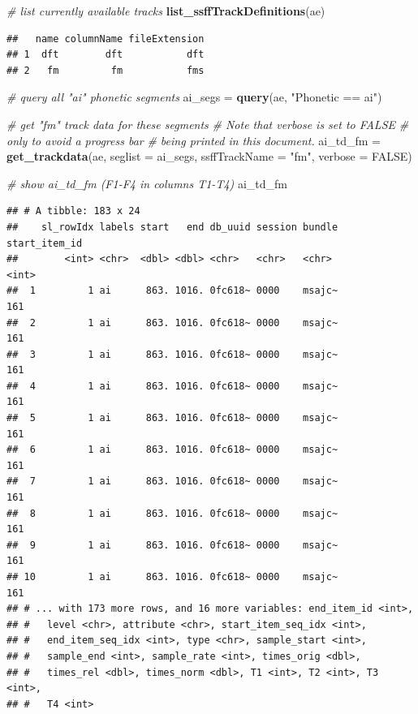\documentclass[]{book}
\newenvironment{Shaded}{\begin{snugshade}}{\end{snugshade}}
\newcommand{\CommentTok}[1]{\textcolor[rgb]{0.56,0.35,0.01}{\textit{#1}}}
\newcommand{\DataTypeTok}[1]{\textcolor[rgb]{0.13,0.29,0.53}{#1}}
\newcommand{\KeywordTok}[1]{\textcolor[rgb]{0.13,0.29,0.53}{\textbf{#1}}}
\newcommand{\NormalTok}[1]{#1}
\newcommand{\OtherTok}[1]{\textcolor[rgb]{0.56,0.35,0.01}{#1}}
\newcommand{\StringTok}[1]{\textcolor[rgb]{0.31,0.60,0.02}{#1}}
\begin{document}
\begin{Shaded}
\begin{Highlighting}[]
\CommentTok{# list currently available tracks}
\KeywordTok{list_ssffTrackDefinitions}\NormalTok{(ae)}
\end{Highlighting}
\end{Shaded}

\begin{verbatim}
##   name columnName fileExtension
## 1  dft        dft           dft
## 2   fm         fm           fms
\end{verbatim}

\begin{Shaded}
\begin{Highlighting}[]
\CommentTok{# query all "ai" phonetic segments}
\NormalTok{ai_segs =}\StringTok{ }\KeywordTok{query}\NormalTok{(ae, }\StringTok{"Phonetic == ai"}\NormalTok{)}

\CommentTok{# get "fm" track data for these segments}
\CommentTok{# Note that verbose is set to FALSE}
\CommentTok{# only to avoid a progress bar}
\CommentTok{# being printed in this document.}
\NormalTok{ai_td_fm =}\StringTok{ }\KeywordTok{get_trackdata}\NormalTok{(ae,}
                         \DataTypeTok{seglist =}\NormalTok{ ai_segs,}
                         \DataTypeTok{ssffTrackName =} \StringTok{"fm"}\NormalTok{,}
                         \DataTypeTok{verbose =} \OtherTok{FALSE}\NormalTok{)}

\CommentTok{# show ai_td_fm (F1-F4 in columns T1-T4)}
\NormalTok{ai_td_fm}
\end{Highlighting}
\end{Shaded}

\begin{verbatim}
## # A tibble: 183 x 24
##    sl_rowIdx labels start   end db_uuid session bundle start_item_id
##        <int> <chr>  <dbl> <dbl> <chr>   <chr>   <chr>          <int>
##  1         1 ai      863. 1016. 0fc618~ 0000    msajc~           161
##  2         1 ai      863. 1016. 0fc618~ 0000    msajc~           161
##  3         1 ai      863. 1016. 0fc618~ 0000    msajc~           161
##  4         1 ai      863. 1016. 0fc618~ 0000    msajc~           161
##  5         1 ai      863. 1016. 0fc618~ 0000    msajc~           161
##  6         1 ai      863. 1016. 0fc618~ 0000    msajc~           161
##  7         1 ai      863. 1016. 0fc618~ 0000    msajc~           161
##  8         1 ai      863. 1016. 0fc618~ 0000    msajc~           161
##  9         1 ai      863. 1016. 0fc618~ 0000    msajc~           161
## 10         1 ai      863. 1016. 0fc618~ 0000    msajc~           161
## # ... with 173 more rows, and 16 more variables: end_item_id <int>,
## #   level <chr>, attribute <chr>, start_item_seq_idx <int>,
## #   end_item_seq_idx <int>, type <chr>, sample_start <int>,
## #   sample_end <int>, sample_rate <int>, times_orig <dbl>,
## #   times_rel <dbl>, times_norm <dbl>, T1 <int>, T2 <int>, T3 <int>,
## #   T4 <int>
\end{verbatim}
\end{document}
